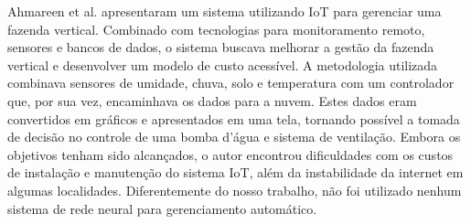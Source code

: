 Ahmareen et al. \cite{ahmareen2024} apresentaram um sistema utilizando IoT para gerenciar uma fazenda vertical. Combinado com tecnologias para monitoramento remoto, sensores e bancos de dados, o sistema buscava melhorar a gestão da fazenda vertical e desenvolver um modelo de custo acessível. A metodologia utilizada combinava sensores de umidade, chuva, solo e temperatura com um controlador que, por sua vez, encaminhava os dados para a nuvem. Estes dados eram convertidos em gráficos e apresentados em uma tela, tornando possível a tomada de decisão no controle de uma bomba d’água e sistema de ventilação. Embora os objetivos tenham sido alcançados, o autor encontrou dificuldades com os custos de instalação e manutenção do sistema IoT, além da instabilidade da internet em algumas localidades. Diferentemente do nosso trabalho, não foi utilizado nenhum sistema de rede neural para gerenciamento automático.
